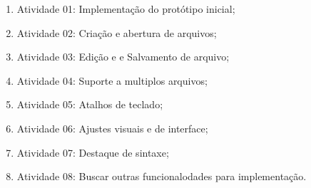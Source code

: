 \begin{enumerate}
	\item Atividade 01: Implementação do protótipo inicial;
	\item Atividade 02: Criação e abertura de arquivos;
	\item Atividade 03: Edição e e Salvamento de arquivo;
	\item Atividade 04: Suporte a multiplos arquivos;
	\item Atividade 05: Atalhos de teclado;
	\item Atividade 06: Ajustes visuais e de interface;
	\item Atividade 07: Destaque de sintaxe;
	\item Atividade 08: Buscar outras funcionalodades para implementação.
\end{enumerate}